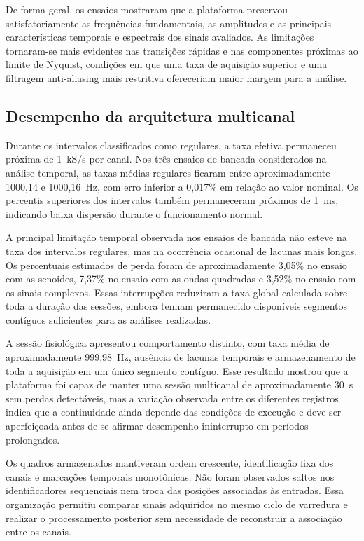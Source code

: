 \documentclass[a4paper,12pt]{fcte}
\begin{document}
De forma geral, os ensaios mostraram que a plataforma preservou satisfatoriamente as frequências fundamentais, as amplitudes e as principais características temporais e espectrais dos sinais avaliados. As limitações tornaram-se mais evidentes nas transições rápidas e nas componentes próximas ao limite de Nyquist, condições em que uma taxa de aquisição superior e uma filtragem anti-aliasing mais restritiva ofereceriam maior margem para a análise.

\subsection{Desempenho da arquitetura multicanal}
\label{subsec:discussao_arquitetura_multicanal}

Durante os intervalos classificados como regulares, a taxa efetiva permaneceu próxima de 1~kS/s por canal. Nos três ensaios de bancada considerados na análise temporal, as taxas médias regulares ficaram entre aproximadamente 1000,14 e 1000,16~Hz, com erro inferior a 0,017\% em relação ao valor nominal. Os percentis superiores dos intervalos também permaneceram próximos de 1~ms, indicando baixa dispersão durante o funcionamento normal.

A principal limitação temporal observada nos ensaios de bancada não esteve na taxa dos intervalos regulares, mas na ocorrência ocasional de lacunas mais longas. Os percentuais estimados de perda foram de aproximadamente 3,05\% no ensaio com as senoides, 7,37\% no ensaio com as ondas quadradas e 3,52\% no ensaio com os sinais complexos. Essas interrupções reduziram a taxa global calculada sobre toda a duração das sessões, embora tenham permanecido disponíveis segmentos contíguos suficientes para as análises realizadas.

A sessão fisiológica apresentou comportamento distinto, com taxa média de aproximadamente 999,98~Hz, ausência de lacunas temporais e armazenamento de toda a aquisição em um único segmento contíguo. Esse resultado mostrou que a plataforma foi capaz de manter uma sessão multicanal de aproximadamente 30~s sem perdas detectáveis, mas a variação observada entre os diferentes registros indica que a continuidade ainda depende das condições de execução e deve ser aperfeiçoada antes de se afirmar desempenho ininterrupto em períodos prolongados.

Os quadros armazenados mantiveram ordem crescente, identificação fixa dos canais e marcações temporais monotônicas. Não foram observados saltos nos identificadores sequenciais nem troca das posições associadas às entradas. Essa organização permitiu comparar sinais adquiridos no mesmo ciclo de varredura e realizar o processamento posterior sem necessidade de reconstruir a associação entre os canais.
\end{document}
